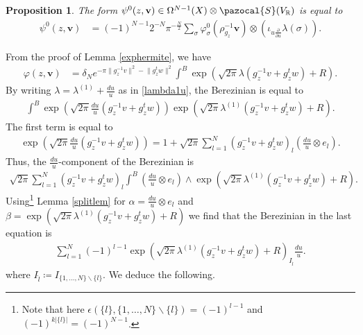 \documentclass[a4paper,11pt]{amsart} %
\newcommand{\8}{\infty}
\newcommand{\vbf}{\mathbf{v}}
\newcommand{\R}{\mathbb{R}}
\newcommand{\Scal}{\pazocal{S}}
\theoremstyle{mytheoremstyle}
\newtheorem{prop}[thm]{Proposition}
\theoremstyle{remark}
\numberwithin{equation}{section}
\begin{document}
\begin{prop} \label{explicitpsi}
    The form  $\psi^0(z,\vbf)  \in \Omega^{N-1}(X)\otimes\Scal(V_\R)$ is equal to
\begin{align}
 \psi^0(z,\vbf) & =(-1)^{N-1} 2^{-N}\pi^{-\frac{N}{2}} \sum_{\sigma}\varphi^0_\sigma(\rho_{g_z}^{-1}\vbf) \otimes \left (\iota_{u\frac{\partial}{\partial u}}\lambda(\sigma) \right ).
\end{align}
\end{prop}

From the proof of Lemma \ref{exphermite}, we have
\begin{align}
\varphi(z,\vbf) & =\delta_Ne^{-\pi \lVert g_z^{-1}v\rVert^2-\lVert g_z^{t}w \rVert^2 }\int^B\exp \left (\sqrt{2\pi} \lambda(g_z^{-1}v+g_z^tw)+R \right ).
\end{align}
By writing $\lambda=\lambda^{(1)}+\frac{du}{u}$ as in \eqref{lambda1u}, the Berezinian is equal to
\begin{align}
\int^B  \exp \left (\sqrt{2\pi} \frac{du}{u}(g_z^{-1}v+g_z^tw) \right ) \exp \left (\sqrt{2\pi} \lambda^{(1)}(g_z^{-1}v+g_z^tw)+R \right ) .
\end{align}
The first term is equal to 
\begin{align}
\exp \left (\sqrt{2\pi} \frac{du}{u}(g_z^{-1}v+g_z^tw) \right )=1+ \sqrt{2\pi}\sum_{l=1}^N (g_z^{-1}v+g_z^tw)_l \left (\frac{du}{u} \otimes e_l \right ).
\end{align}
Thus, the $\frac{du}{u}$-component of the Berezinian is
\begin{align}
\sqrt{2\pi}\sum_{l=1}^N (g_z^{-1}v+g_z^tw)_l \int^B\left (\frac{du}{u} \otimes e_l \right ) \wedge \exp \left (\sqrt{2\pi} \lambda^{(1)}(g_z^{-1}v+g_z^tw)+R \right ) .
\end{align}
Using\footnote{Note that here $\epsilon(\{l\},\{1,\dots,N\}\smallsetminus\{l\})=(-1)^{l-1}$ and $(-1)^{k \vert \{l\} \vert } =(-1)^{N-1}$.}  Lemma \ref{splitlem} for $\alpha=\frac{du}{u} \otimes e_l$ and $\beta=\exp \left (\sqrt{2\pi} \lambda^{(1)}(g_z^{-1}v+g_z^tw)+R \right )$ we find that the Berezinian in the last equation is
\begin{align}
\sum_{l=1}^N (-1)^{l-1}  \exp \left (\sqrt{2\pi} \lambda^{(1)}(g_z^{-1}v+g_z^tw)+R \right )_{I_{\widehat{l}}} \frac{du}{u}.
\end{align}
where $I_{\widehat{l}} \coloneqq I_{\{1,\dots,N\}\smallsetminus\{l\}}$. We deduce the following.
\end{document}
